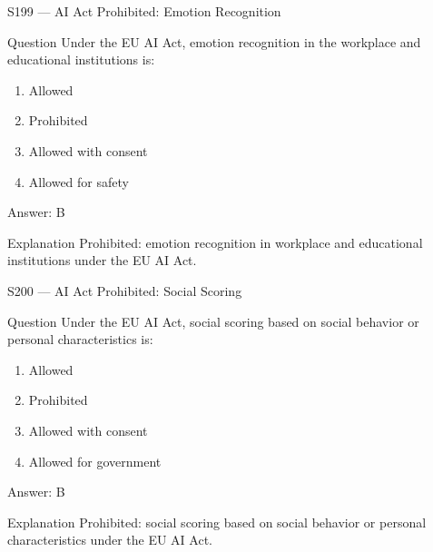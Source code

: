 \documentclass[aspectratio=169,8pt]{beamer}
\begin{document}
	\begin{frame}{S199 --- AI Act Prohibited: Emotion Recognition}
		\begin{block}{Question}
			Under the EU AI Act, emotion recognition in the workplace and educational institutions is:
			\begin{enumerate}
				\item Allowed
				\item Prohibited
				\item Allowed with consent
				\item Allowed for safety
			\end{enumerate}
		\end{block}
		\begin{exampleblock}{Answer: B}\end{exampleblock}
		\begin{block}{Explanation}
			Prohibited: emotion recognition in workplace and educational institutions under the EU AI Act.
		\end{block}
	\end{frame}
	
	\begin{frame}{S200 --- AI Act Prohibited: Social Scoring}
		\begin{block}{Question}
			Under the EU AI Act, social scoring based on social behavior or personal characteristics is:
			\begin{enumerate}
				\item Allowed
				\item Prohibited
				\item Allowed with consent
				\item Allowed for government
			\end{enumerate}
		\end{block}
		\begin{exampleblock}{Answer: B}\end{exampleblock}
		\begin{block}{Explanation}
			Prohibited: social scoring based on social behavior or personal characteristics under the EU AI Act.
		\end{block}
	\end{frame}
	
\end{document}
